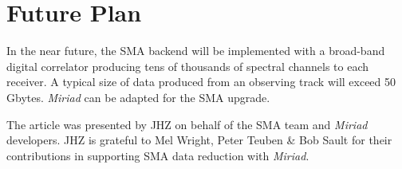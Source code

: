 \section{Future Plan}
In the near future, the SMA backend will be implemented with a broad-band digital
correlator producing  tens of thousands of spectral  channels to each receiver.
A typical size of data produced from an observing track will exceed 50 Gbytes. 
{\it Miriad} can be adapted for the SMA upgrade.  

\acknowledgements The article was presented by JHZ on behalf of the SMA
team and {\it Miriad} developers. JHZ is grateful to Mel Wright, Peter
Teuben \& Bob Sault for their contributions in supporting SMA data reduction 
with {\it Miriad}. 


